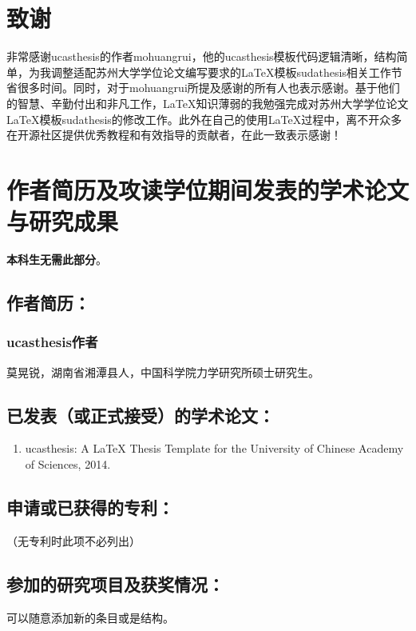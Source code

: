 \chapter[致谢]{致\quad 谢}%

非常感谢ucasthesis的作者mohuangrui，他的ucasthesis模板代码逻辑清晰，结构简单，为我调整适配苏州大学学位论文编写要求的\LaTeX{}模板sudathesis相关工作节省很多时间。同时，对于mohuangrui所提及感谢的所有人也表示感谢。基于他们的智慧、辛勤付出和非凡工作，\LaTeX{}知识薄弱的我勉强完成对苏州大学学位论文\LaTeX{}模板sudathesis的修改工作。此外在自己的使用\LaTeX{}过程中，离不开众多在开源社区提供优秀教程和有效指导的贡献者，在此一致表示感谢！





\chapter{作者简历及攻读学位期间发表的学术论文与研究成果}

\textbf{本科生无需此部分}。

\section*{作者简历：}


\subsection*{ucasthesis作者}

莫晃锐，湖南省湘潭县人，中国科学院力学研究所硕士研究生。

\section*{已发表（或正式接受）的学术论文：}

{
\setlist[enumerate]{}%
\begin{enumerate}[nosep]
    \item ucasthesis: A LaTeX Thesis Template for the University of Chinese Academy of Sciences, 2014.
\end{enumerate}
}

\section*{申请或已获得的专利：}

（无专利时此项不必列出）

\section*{参加的研究项目及获奖情况：}

可以随意添加新的条目或是结构。

\cleardoublepage[plain]%

